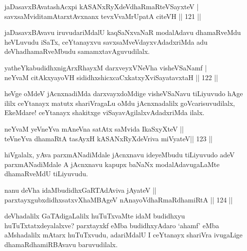 \begin{shl}
jaDasavxBAvatashAcxpi kASANxRyXdeVdhaRmaRteVSayxteV | \\
savxsaMviditamAtarxtAvxnanx tevxVvaMrUpatA citeVH \hfill||  121 ||  
\end{shl}

\begin{artha}
jaDasavxBAvavu iruvudariMdalU kaqSaNxvaNaR modalAdavu dhamaRveMdu heVLuvudu iSaTx, ceYtanayxvu savxsaMveVdayxvAdadxriMda adu deVhadhamaRveMbudu samamxtavAguvudilalx.
\end{artha}

\begin{shl}
yatheYkabudidhxnigArxRhayxM darxveyxVNeVha visheVSaNamf | \\
neYvaM citAkxyayoVH sididhxshicxcaCxkatxyXviSayatavxtaH \hfill||  122 ||  
\end{shl}

\begin{artha}
heVge oMdeV jAcnxnadiMda darxvayxdoMdige visheVSaNavu tiLiyuvudo hAge ililx ceYtanayx matutx shariVragaLu oMdu jAcnxnadalilx goVcarisuvudilalx, EkeMdare! ceYtanayx shakitxge viSayavAgilalxvAdadxriMda ilalx.
\end{artha}


\begin{shl}
neYvaM yeVneYva mAneVna satAtx saMvida IkaSxyXteV ||  \\
teVneYva dhamaRtA tasAyxH kASANxRyXdeVriva miVyateV\hfill ||  123 ||  
\end{shl}

\begin{artha}
hiVgalalx, yAva parxmANadiMdale jAcnxnavu ideyeMbudu tiLiyuvudo adeV parxmANadiMdale A jAcnxnavu kapupx baNaNx modalAdavugaLaMte dhamaRveMdU tiLiyuvudu.
\end{artha}


\begin{shl}
nanu deVha idaMbudidhxGaRTAdAviva jAyateV ||  \\
parxtayxgubxdidhxsatxvXhaMBAgeV nAnayoVdhaRmaRdhamiRtA \hfill ||  124 ||  
\end{shl}

\begin{artha}
deVhadalilx GaTAdigaLalilx huTuTxvaMte idaM budidhxyu huTuTxtatxdeyalalxve? parxtayxkf eMba budidhxyAdaro `ahamf' eMba aMshadalilx mAtarx huTuTxvudu, adariMdalU I ceYtanayx shariVra ivugaLige dhamaRdhamiRBAvavu baruvudilalx.
\end{artha}

